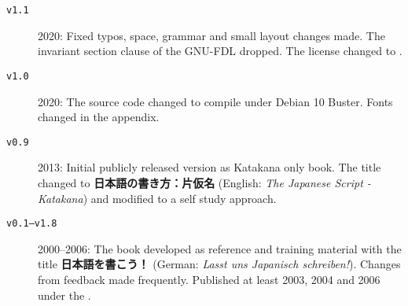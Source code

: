 \begin{flushleft}
{\begin{description}
    \item[\jfontsizenine\texttt{v1.1}]\jfontsizenine

      2020: Fixed typos, space, grammar and small layout changes made. The
      invariant section clause of the GNU-FDL dropped. The license changed to
      \textit{}.

    \item[\jfontsizenine\texttt{v1.0}]\jfontsizenine

      2020: The source code changed to compile under Debian 10 Buster. Fonts
      changed in the appendix.

    \item[\jfontsizenine\texttt{v0.9}]\jfontsizenine

      2013: Initial publicly released version as Katakana only book. The title
      changed to \textbf{日本語の書き方：片仮名} (English: \textit{The Japanese
      Script - Katakana}) and modified to a self study approach.

    \item[\jfontsizenine\texttt{v0.1–v1.8}]\jfontsizenine

      2000–2006: The book developed as reference and training material with the
      title \textbf{日本語を書こう！} (German: \textit{Lasst uns Japanisch
      schreiben!}). Changes from feedback made frequently.  Published at least
      2003, 2004 and 2006 under the \textit{}.

  \end{description}

}

\end{flushleft}
\endgroup
\clearpage
\newpage

